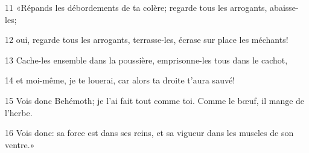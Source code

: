 11 «Répands les débordements de ta colère; regarde tous les arrogants, abaisse-les;

12 oui, regarde tous les arrogants, terrasse-les, écrase sur place les méchants!

13 Cache-les ensemble dans la poussière, emprisonne-les tous dans le cachot,

14 et moi-même, je te louerai, car alors ta droite t’aura sauvé!

15 Vois donc Behémoth; je l’ai fait tout comme toi. Comme le bœuf, il mange de l’herbe.

16 Vois donc: sa force est dans ses reins, et sa vigueur dans les muscles de son ventre.»